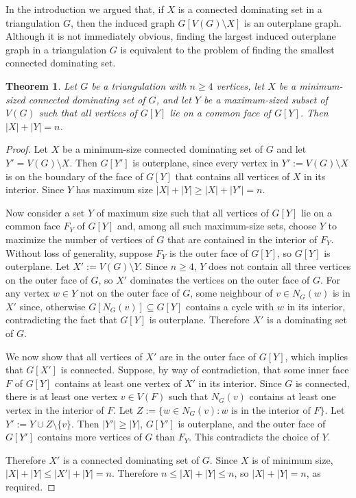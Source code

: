 \documentclass{article}
\newtheorem{thm}{Theorem}
\theoremstyle{definition}
\begin{document}
In the introduction we argued that, if $X$ is a connected dominating set in a triangulation $G$, then the induced graph $G[V(G)\setminus X]$ is an outerplane graph.  Although it is not immediately obvious, finding the largest induced outerplane graph in a triangulation $G$ is equivalent to the problem of finding the smallest connected dominating set.

\begin{thm}
  Let $G$ be a triangulation with $n\ge 4$ vertices, let $X$ be a minimum-sized connected dominating set of $G$, and let $Y$ be a maximum-sized subset of $V(G)$ such that all vertices of $G[Y]$ lie on a common face of $G[Y]$. Then $|X|+|Y|=n$.
\end{thm}

\begin{proof}
  Let $X$ be a minimum-size connected dominating set of $G$ and let $Y'=V(G)\setminus X$.  Then $G[Y']$ is outerplane, since every vertex in $Y':=V(G)\setminus X$ is on the boundary of the face of $G[Y]$ that contains all vertices of $X$ in its interior.  Since $Y$ has maximum size $|X|+|Y|\ge |X|+|Y'|= n$.

  Now consider a set $Y$ of maximum size such that all vertices of $G[Y]$ lie on a common face $F_Y$ of $G[Y]$ and, among all such maximum-size sets, choose $Y$ to maximize the number of vertices of $G$ that are contained in the interior of $F_Y$.  Without loss of generality, suppose $F_Y$ is the outer face of $G[Y]$, so $G[Y]$ is outerplane.  Let $X':=V(G)\setminus Y$. Since $n\ge 4$, $Y$ does not contain all three vertices on the outer face of $G$, so $X'$ dominates the vertices on the outer face of $G$. For any vertex $w\in Y$ not on the outer face of $G$, some neighbour of $v\in N_G(w)$ is in $X'$ since, otherwise $G[N_G(v)]\subseteq G[Y]$ contains a cycle with $w$ in its interior, contradicting the fact that $G[Y]$ is outerplane. Therefore $X'$ is a dominating set of $G$.

  We now show that all vertices of $X'$ are in the outer face of $G[Y]$, which implies that $G[X']$ is connected.  Suppose, by way of contradiction, that some inner face $F$ of $G[Y]$ contains at least one vertex of $X'$ in its interior.  Since $G$ is connected, there is at least one vertex $v\in V(F)$ such that $N_G(v)$ contains at least one vertex in the interior of $F$.  Let $Z:=\{w\in N_G(v):\text{$w$ is in the interior of $F$}\}$. Let $Y':=Y\cup Z \setminus\{v\}$.  Then $|Y'|\ge |Y|$, $G[Y']$ is outerplane, and the outer face of $G[Y']$ contains more vertices of $G$ than  $F_Y$. This contradicts the choice of $Y$.

  Therefore $X'$ is a connected dominating set of $G$.  Since $X$ is of minimum size, $|X|+|Y|\le |X'|+|Y|=n$.  Therefore $n\le |X|+|Y|\le n$, so $|X|+|Y|=n$, as required.
\end{proof}
\end{document}

